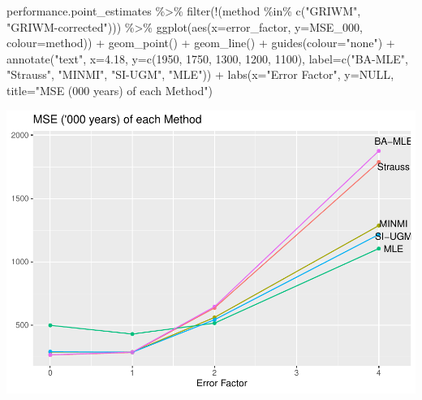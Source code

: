 \documentclass[
]{article}
\newenvironment{Shaded}{\begin{snugshade}}{\end{snugshade}}
\newcommand{\AttributeTok}[1]{\textcolor[rgb]{0.77,0.63,0.00}{#1}}
\newcommand{\ConstantTok}[1]{\textcolor[rgb]{0.00,0.00,0.00}{#1}}
\newcommand{\DecValTok}[1]{\textcolor[rgb]{0.00,0.00,0.81}{#1}}
\newcommand{\FloatTok}[1]{\textcolor[rgb]{0.00,0.00,0.81}{#1}}
\newcommand{\FunctionTok}[1]{\textcolor[rgb]{0.00,0.00,0.00}{#1}}
\newcommand{\NormalTok}[1]{#1}
\newcommand{\SpecialCharTok}[1]{\textcolor[rgb]{0.00,0.00,0.00}{#1}}
\newcommand{\StringTok}[1]{\textcolor[rgb]{0.31,0.60,0.02}{#1}}
\begin{document}
\begin{Shaded}
\begin{Highlighting}[]
\NormalTok{performance.point\_estimates }\SpecialCharTok{\%\textgreater{}\%}
  \FunctionTok{filter}\NormalTok{(}\SpecialCharTok{!}\NormalTok{(method }\SpecialCharTok{\%in\%} \FunctionTok{c}\NormalTok{(}\StringTok{"GRIWM"}\NormalTok{, }\StringTok{"GRIWM{-}corrected"}\NormalTok{))) }\SpecialCharTok{\%\textgreater{}\%}
  \FunctionTok{ggplot}\NormalTok{(}\FunctionTok{aes}\NormalTok{(}\AttributeTok{x=}\NormalTok{error\_factor, }\AttributeTok{y=}\NormalTok{MSE\_000, }\AttributeTok{colour=}\NormalTok{method)) }\SpecialCharTok{+}
  \FunctionTok{geom\_point}\NormalTok{() }\SpecialCharTok{+}
  \FunctionTok{geom\_line}\NormalTok{() }\SpecialCharTok{+}
  \FunctionTok{guides}\NormalTok{(}\AttributeTok{colour=}\StringTok{"none"}\NormalTok{) }\SpecialCharTok{+}
  \FunctionTok{annotate}\NormalTok{(}\StringTok{"text"}\NormalTok{, }\AttributeTok{x=}\FloatTok{4.18}\NormalTok{, }\AttributeTok{y=}\FunctionTok{c}\NormalTok{(}\DecValTok{1950}\NormalTok{, }\DecValTok{1750}\NormalTok{, }\DecValTok{1300}\NormalTok{, }\DecValTok{1200}\NormalTok{, }\DecValTok{1100}\NormalTok{), }\AttributeTok{label=}\FunctionTok{c}\NormalTok{(}\StringTok{"BA{-}MLE"}\NormalTok{, }\StringTok{"Strauss"}\NormalTok{, }\StringTok{"MINMI"}\NormalTok{, }\StringTok{"SI{-}UGM"}\NormalTok{, }\StringTok{"MLE"}\NormalTok{)) }\SpecialCharTok{+}
  \FunctionTok{labs}\NormalTok{(}\AttributeTok{x=}\StringTok{"Error Factor"}\NormalTok{, }\AttributeTok{y=}\ConstantTok{NULL}\NormalTok{, }\AttributeTok{title=}\StringTok{"MSE (\textquotesingle{}000 years) of each Method"}\NormalTok{)}
\end{Highlighting}
\end{Shaded}

\includegraphics{sim_exp-results_files/figure-latex/unnamed-chunk-5-1.pdf}
\end{document}
